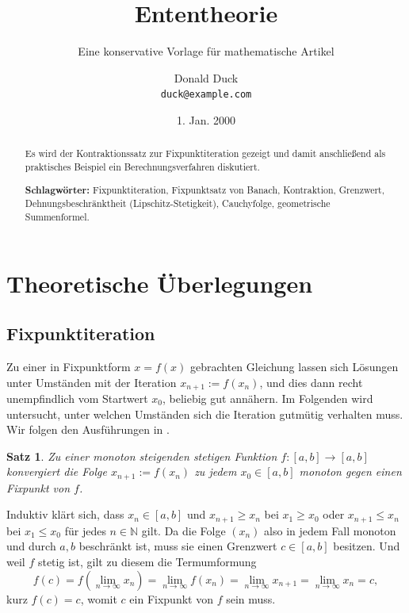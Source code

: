 \documentclass[
  a4paper, 10pt, fleqn, twoside, twocolumn,
  abstract=true
]{scrartcl}
\title{Ententheorie}
\subtitle{Eine konservative Vorlage für mathematische Artikel}
\author{Donald Duck\\ \large\texttt{duck@example.com}}
\date{1. Jan. 2000}
\makeatletter
\renewenvironment{proof}[1][\proofname]{\par
  \normalfont\topsep2\p@\@plus2\p@\relax
  \trivlist
  \item[\hskip\labelsep\bfseries #1\@addpunct{.}]\ignorespaces
}{\endtrivlist\@endpefalse}
\theoremstyle{plain}
\newtheorem{theorem}{Satz}[section]
\theoremstyle{definition}
\newcommand{\strong}[1]{\textbf{#1}}
\newcommand{\keywords}[1]{%
  \vspace{0.6em}\noindent\strong{Schlagwörter:} #1}
\newcommand{\N}{\mathbb N}
\makeatother
\begin{document}
\maketitle

\begin{abstract}\noindent
Es wird der Kontraktionssatz zur Fixpunktiteration gezeigt und damit
anschließend als praktisches Beispiel ein Berechnungsverfahren
diskutiert.

\keywords{Fixpunktiteration, Fixpunktsatz von Banach,
Kontraktion, Grenzwert, Dehnungsbeschränktheit (Lipschitz-Stetigkeit),
Cauchyfolge, geometrische Summenformel.}
\end{abstract}

\tableofcontents

\section{Theoretische Überlegungen}

\subsection{Fixpunktiteration}

Zu einer in Fixpunktform $x=f(x)$ gebrachten Gleichung lassen sich
Lösungen unter Umständen mit der Iteration $x_{n+1} := f(x_n)$, und
dies dann recht unempfindlich vom Startwert $x_0$, beliebig gut annähern.
Im Folgenden wird untersucht, unter welchen Umständen sich die Iteration
gutmütig verhalten muss. Wir folgen den Ausführungen in \cite{Heuser1}.

\begin{theorem}
Zu einer monoton steigenden stetigen Funktion $f\colon [a,b]\to [a,b]$
konvergiert die Folge $x_{n+1} := f(x_n)$ zu jedem $x_0\in [a,b]$ monoton
gegen einen Fixpunkt von $f$.
\end{theorem}

\begin{proof}
Induktiv klärt sich, dass $x_n\in [a,b]$ und $x_{n+1}\ge x_n$ bei
$x_1\ge x_0$ oder $x_{n+1}\le x_n$ bei $x_1\le x_0$ für jedes
$n\in\N$ gilt. Da die Folge $(x_n)$ also in jedem Fall monoton und durch
$a,b$ beschränkt ist, muss sie einen Grenzwert $c\in [a,b]$ besitzen.
Und weil $f$ stetig ist, gilt zu diesem die Termumformung
\[f(c) = f(\lim_{n\to\infty} x_n) = \lim_{n\to\infty} f(x_n) =
\lim_{n\to\infty} x_{n+1} = \lim_{n\to\infty} x_n = c,\]
kurz $f(c) = c$, womit $c$ ein Fixpunkt von $f$ sein muss.\,\qedsymbol
\end{proof}
\end{document}
